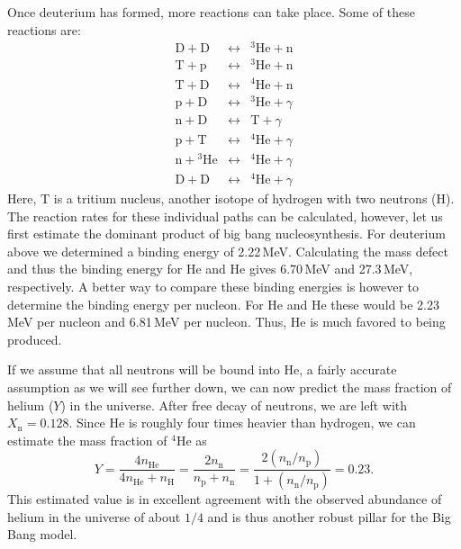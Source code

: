 Once deuterium has formed, more reactions can take place. Some of these reactions are:
\begin{eqnarray}
    \mathrm{D} + \mathrm{D} &\longleftrightarrow& ^3\mathrm{He} + \mathrm{n} \\
    \mathrm{T} + \mathrm{p} &\longleftrightarrow& ^3\mathrm{He} + \mathrm{n} \\
    \mathrm{T} + \mathrm{D} &\longleftrightarrow& ^4\mathrm{He} + \mathrm{n} \\
    \mathrm{p} + \mathrm{D} &\longleftrightarrow& ^3\mathrm{He} + \gamma \\
    \mathrm{n} + \mathrm{D} &\longleftrightarrow& \mathrm{T} + \gamma \\
    \mathrm{p} + \mathrm{T} &\longleftrightarrow& ^4\mathrm{He} + \gamma \\
    \mathrm{n} + {^3}\mathrm{He} &\longleftrightarrow& ^4\mathrm{He} + \gamma \\
    \mathrm{D} + \mathrm{D} &\longleftrightarrow& ^4\mathrm{He} + \gamma
\end{eqnarray}
Here, T is a tritium nucleus, another isotope of hydrogen with two neutrons (H). The reaction rates for these individual paths can be calculated, however, let us first estimate the dominant product of big bang nucleosynthesis. For deuterium above we determined a binding energy of 2.22\,MeV. Calculating the mass defect and thus the binding energy for He and He gives 6.70\,MeV and 27.3\,MeV, respectively. A better way to compare these binding energies is however to determine the binding energy per nucleon. For He and He these would be 2.23\,MeV per nucleon and 6.81\,MeV per nucleon. Thus, He is much favored to being produced. 

If we assume that all neutrons will be bound into He, a fairly accurate assumption as we will see further down, we can now predict the mass fraction of helium ($Y$) in the universe. After free decay of neutrons, we are left with $X_\mathrm{n} = 0.128$. Since He is roughly four times heavier than hydrogen, we can estimate the mass fraction of $^{4}$He as
\begin{equation}
    Y = \frac{4n_\mathrm{He}}{4n_\mathrm{He} + n_\mathrm{H}} 
        = \frac{2n_\mathrm{n}}{n_\mathrm{p} + n_\mathrm{n}}
        = \frac{2(n_\mathrm{n} / n_\mathrm{p})}{1+(n_\mathrm{n}/n_\mathrm{p})}
        = 0.23.
\end{equation}
This estimated value is in excellent agreement with the observed abundance of helium in the universe of about $1/4$ and is thus another robust pillar for the Big Bang model.


